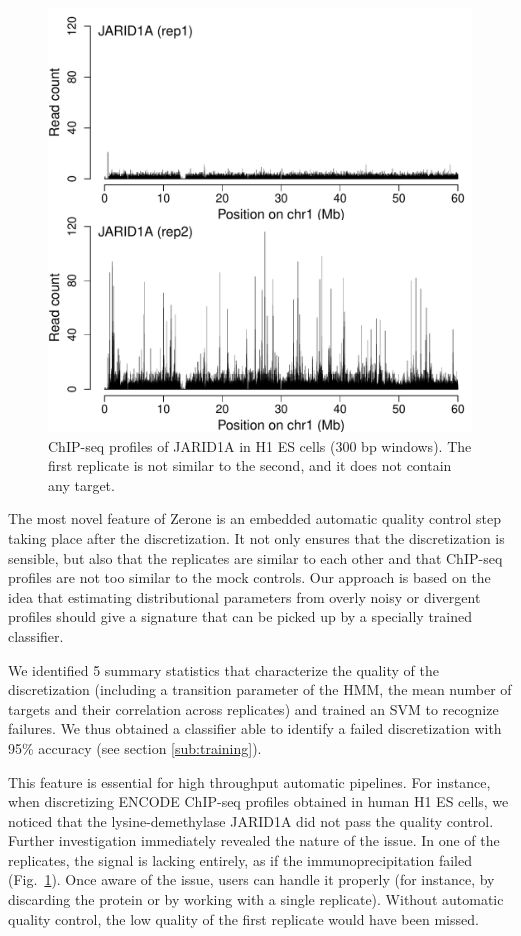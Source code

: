 \documentclass{bioinfo}
\begin{document}
\begin{figure}[!tpb]
\centerline{\includegraphics[scale=0.5]{jarid.pdf}}
\caption{
  ChIP-seq profiles of JARID1A in H1 ES cells (300 bp windows).
  The first replicate is not similar to the second, and it does not
  contain any target.
}\label{fig:jarid}
\end{figure}

The most novel feature of Zerone is an embedded automatic quality
control step taking place after the discretization. It not only
ensures that the discretization is sensible, but also that the
replicates are similar to each other and that ChIP-seq profiles
are not too similar to the mock controls. Our approach is based
on the idea that estimating distributional parameters from
overly noisy or divergent profiles should give a signature that
can be picked up by a specially trained classifier.

We identified 5 summary statistics that characterize the quality of
the discretization (including a transition parameter of the HMM,
the mean number of targets and their correlation across replicates)
and trained an SVM to recognize failures. We thus obtained a
classifier able to identify a failed discretization
with 95\% accuracy (see section \ref{sub:training}).

This feature is essential for high throughput automatic pipelines.
For instance, when discretizing ENCODE ChIP-seq profiles obtained in
human H1 ES cells, we noticed that the lysine-demethylase JARID1A did
not pass the quality control.
Further investigation immediately revealed the nature of the issue.
In one of the replicates, the signal is lacking entirely, as if
the immunoprecipitation failed (Fig.~\ref{fig:jarid}).
Once aware of the issue, users can handle it properly (for instance,
by discarding the protein or by working with a single replicate).
Without automatic quality control, the low quality of the first replicate
would have been missed.
\end{document}
